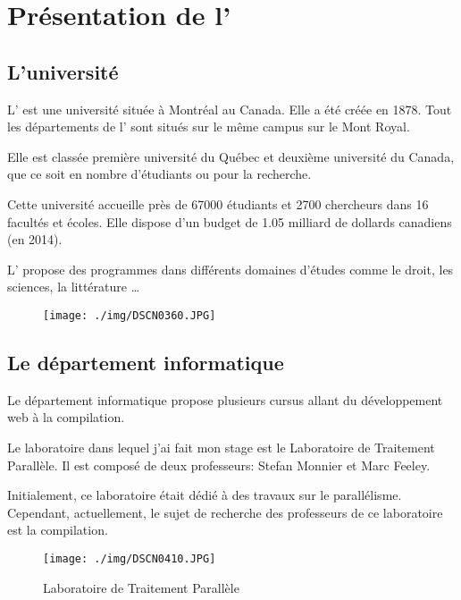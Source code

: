 \chapter{Présentation de l'\udem{}}

    \section{L'université}

        L'\udem{} est une université située à Montréal au Canada.
        Elle a été créée en 1878.
        Tout les départements de l'\udem{} sont situés sur le même campus sur le Mont Royal.

        Elle est classée première université du Québec\cite{udemnum} et deuxième université du Canada\cite{udemnum}, que ce soit en nombre
        d'étudiants ou pour la recherche.

        Cette université accueille près de \num{67 000} étudiants et \num{2 700} chercheurs dans 16 facultés et écoles\cite{udemnum}.
        Elle dispose d'un budget de \num{1,05} milliard de dollards canadiens\cite{wikinum} (en 2014).

        L'\udem{} propose des programmes dans différents domaines d'études comme le droit, les sciences, la littérature \dots
        \begin{figure}[!h]
            \centering
            \texttt{[image: ./img/DSCN0360.JPG]}
            \caption{\udem{}}
\label{fig:udem}
        \end{figure}
        \clearpage

        \section{Le département informatique}

        Le département informatique propose plusieurs cursus allant du développement web à la compilation.

        Le laboratoire dans lequel j'ai fait mon stage est le Laboratoire de Traitement Parallèle.
        Il est composé de deux professeurs: Stefan Monnier et Marc Feeley.

        Initialement, ce laboratoire était dédié à des travaux sur le parallélisme.
        Cependant, actuellement, le sujet de recherche des professeurs de ce laboratoire est la compilation.
        \begin{figure}[!h]
            \centering
            \texttt{[image: ./img/DSCN0410.JPG]}
            \caption{Laboratoire de Traitement Parallèle}
\label{fig:ltp}
        \end{figure}


